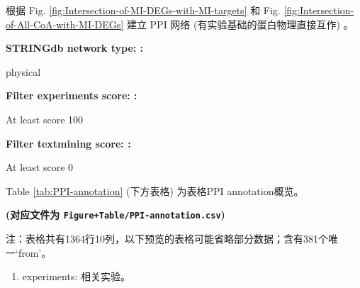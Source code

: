 \documentclass[
]{article}
\providecommand{\tightlist}{%
  \setlength{\itemsep}{0pt}\setlength{\parskip}{0pt}}
\begin{document}
根据 Fig. \ref{fig:Intersection-of-MI-DEGs-with-MI-targets}
和 Fig. \ref{fig:Intersection-of-All-CoA-with-MI-DEGs}
建立 PPI 网络 (有实验基础的蛋白物理直接互作) 。

\begin{center}\begin{tcolorbox}[colback=gray!10, colframe=gray!50, width=0.9\linewidth, arc=1mm, boxrule=0.5pt]
\textbf{
STRINGdb network type:
:}

\vspace{0.5em}

    physical

\vspace{2em}


\textbf{
Filter experiments score:
:}

\vspace{0.5em}

    At least score 100

\vspace{2em}


\textbf{
Filter textmining score:
:}

\vspace{0.5em}

    At least score 0

\vspace{2em}
\end{tcolorbox}
\end{center}

Table \ref{tab:PPI-annotation} (下方表格) 为表格PPI annotation概览。

\textbf{(对应文件为 \texttt{Figure+Table/PPI-annotation.csv})}

\begin{center}\begin{tcolorbox}[colback=gray!10, colframe=gray!50, width=0.9\linewidth, arc=1mm, boxrule=0.5pt]注：表格共有1364行10列，以下预览的表格可能省略部分数据；含有381个唯一`from'。
\end{tcolorbox}
\end{center}
\begin{center}\begin{tcolorbox}[colback=gray!10, colframe=gray!50, width=0.9\linewidth, arc=1mm, boxrule=0.5pt]\begin{enumerate}\tightlist
\item experiments:  相关实验。
\end{enumerate}\end{tcolorbox}
\end{center}
\end{document}
